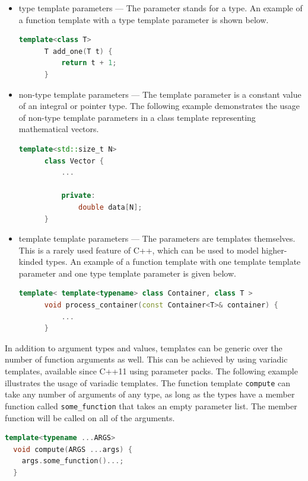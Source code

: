 \documentclass[fontsize=11pt, appendixprefix=true]{scrreprt}
\begin{document}
\begin{itemize}
  \item type template parameters --- The parameter stands for a type. An example
    of a function template with a type template parameter is shown below.

    \begin{lstlisting}[language=c++]
      template<class T>
      T add_one(T t) {
          return t + 1;
      }
    \end{lstlisting}
  
  \item non-type template parameters --- The template parameter is a constant
    value of an integral or pointer type. The following example demonstrates the
    usage of non-type template parameters in a class template representing
    mathematical vectors.

    \begin{lstlisting}[language=c++]
      template<std::size_t N>
      class Vector {
          ...

          private:
              double data[N];
      }
    \end{lstlisting}

  \item template template parameters --- The parameters are templates
    themselves. This is a rarely used feature of C++, which can be used to model
    higher-kinded types. An example of a function template with one template
    template parameter and one type template parameter is given below.

    \begin{lstlisting}[language=c++]
      template< template<typename> class Container, class T >
      void process_container(const Container<T>& container) {
          ...
      }
    \end{lstlisting}
\end{itemize}

In addition to argument types and values, templates can be generic over the
number of function arguments as well. This can be achieved by using variadic
templates, available since C++11 using parameter packs. The following example
illustrates the usage of variadic templates. The function template
\texttt{compute} can take any number of arguments of any type, as long as the
types have a member function called \texttt{some\_function} that takes an empty
parameter list. The member function will be called on all of the arguments.

\begin{lstlisting}[language=c++]
  template<typename ...ARGS>
  void compute(ARGS ...args) {
	args.some_function()...;	
  }
\end{lstlisting}
\end{document}
